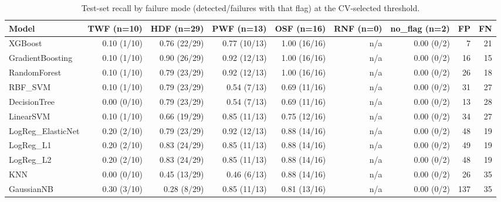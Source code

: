 \begin{table}[ht]
\centering
\small
\caption{Test-set recall by failure mode (detected/failures with that flag) at the CV-selected threshold.}
\label{tab:error_by_mode}
\begin{tabular}{lrrrrrrrr}
\toprule
Model & TWF (n=10) & HDF (n=29) & PWF (n=13) & OSF (n=16) & RNF (n=0) & no\_flag (n=2) & FP & FN \\
\midrule
XGBoost & 0.10 (1/10) & 0.76 (22/29) & 0.77 (10/13) & 1.00 (16/16) & n/a & 0.00 (0/2) & 7 & 21 \\
GradientBoosting & 0.10 (1/10) & 0.90 (26/29) & 0.92 (12/13) & 1.00 (16/16) & n/a & 0.00 (0/2) & 16 & 15 \\
RandomForest & 0.10 (1/10) & 0.79 (23/29) & 0.92 (12/13) & 1.00 (16/16) & n/a & 0.00 (0/2) & 26 & 18 \\
RBF\_SVM & 0.10 (1/10) & 0.79 (23/29) & 0.54 (7/13) & 0.69 (11/16) & n/a & 0.00 (0/2) & 31 & 27 \\
DecisionTree & 0.00 (0/10) & 0.79 (23/29) & 0.54 (7/13) & 0.69 (11/16) & n/a & 0.00 (0/2) & 13 & 28 \\
LinearSVM & 0.10 (1/10) & 0.66 (19/29) & 0.85 (11/13) & 0.75 (12/16) & n/a & 0.00 (0/2) & 34 & 27 \\
LogReg\_ElasticNet & 0.20 (2/10) & 0.79 (23/29) & 0.92 (12/13) & 0.88 (14/16) & n/a & 0.00 (0/2) & 48 & 19 \\
LogReg\_L1 & 0.20 (2/10) & 0.83 (24/29) & 0.85 (11/13) & 0.88 (14/16) & n/a & 0.00 (0/2) & 49 & 19 \\
LogReg\_L2 & 0.20 (2/10) & 0.83 (24/29) & 0.85 (11/13) & 0.88 (14/16) & n/a & 0.00 (0/2) & 48 & 19 \\
KNN & 0.00 (0/10) & 0.45 (13/29) & 0.46 (6/13) & 0.88 (14/16) & n/a & 0.00 (0/2) & 26 & 35 \\
GaussianNB & 0.30 (3/10) & 0.28 (8/29) & 0.85 (11/13) & 0.81 (13/16) & n/a & 0.00 (0/2) & 137 & 35 \\
\bottomrule
\end{tabular}
\end{table}
